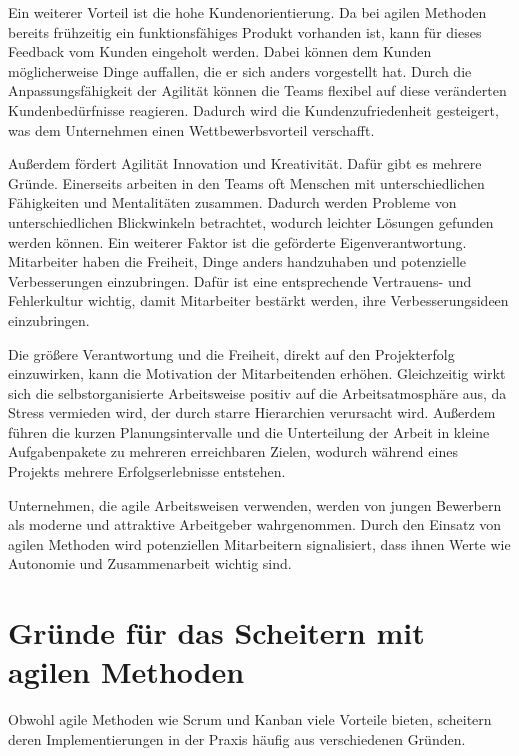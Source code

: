 \documentclass[ngerman]{seminarvorlage}
\begin{document}
Ein weiterer Vorteil ist die hohe Kundenorientierung. Da bei agilen Methoden bereits frühzeitig ein funktionsfähiges Produkt vorhanden ist, kann für dieses Feedback vom Kunden eingeholt werden. Dabei können dem Kunden möglicherweise Dinge auffallen, die er sich anders vorgestellt hat. Durch die Anpassungsfähigkeit der Agilität können die Teams flexibel auf diese veränderten Kundenbedürfnisse reagieren. Dadurch wird die Kundenzufriedenheit gesteigert, was dem Unternehmen einen Wettbewerbsvorteil verschafft.\cite{Theobald.2021,facebook.2024}

Außerdem fördert Agilität Innovation und Kreativität. Dafür gibt es mehrere Gründe. Einerseits arbeiten in den Teams oft Menschen mit unterschiedlichen Fähigkeiten und Mentalitäten zusammen. Dadurch werden Probleme von unterschiedlichen Blickwinkeln betrachtet, wodurch leichter Lösungen gefunden werden können.  Ein weiterer Faktor ist die geförderte Eigenverantwortung. Mitarbeiter haben die Freiheit, Dinge anders handzuhaben und potenzielle Verbesserungen einzubringen. Dafür ist eine entsprechende Vertrauens- und Fehlerkultur wichtig, damit Mitarbeiter bestärkt werden, ihre Verbesserungsideen einzubringen. \cite{Theobald.2021}

Die größere Verantwortung und die Freiheit, direkt auf den Projekterfolg einzuwirken, kann die Motivation der Mitarbeitenden erhöhen. Gleichzeitig wirkt sich die selbstorganisierte Arbeitsweise positiv auf die Arbeitsatmosphäre aus, da Stress vermieden wird, der durch starre Hierarchien verursacht wird. Außerdem führen die kurzen Planungsintervalle und die Unterteilung der Arbeit in kleine Aufgabenpakete zu mehreren erreichbaren Zielen, wodurch während eines Projekts mehrere Erfolgserlebnisse entstehen.\cite{Theobald.2021}

Unternehmen, die agile Arbeitsweisen verwenden, werden von jungen Bewerbern als moderne und attraktive Arbeitgeber wahrgenommen. Durch den Einsatz von agilen Methoden wird potenziellen Mitarbeitern signalisiert, dass ihnen Werte wie Autonomie und Zusammenarbeit wichtig sind.\cite{personio.2024}

\newpage
\section{Gründe für das Scheitern mit agilen Methoden}

Obwohl agile Methoden wie Scrum und Kanban viele Vorteile bieten, scheitern deren Implementierungen in der Praxis häufig aus verschiedenen Gründen. \\
\end{document}

